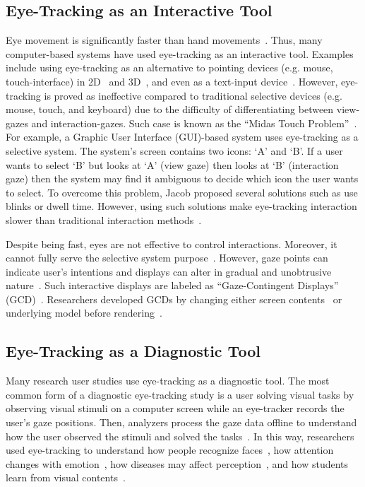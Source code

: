 \subsection{Eye-Tracking as an Interactive Tool}
\label{sec:EyeTrackingInteractive}
Eye movement is significantly faster than hand movements~\cite{sibert2000evaluation}. Thus, many computer-based systems have used eye-tracking as an interactive tool. Examples include using eye-tracking as an alternative to pointing devices (e.g. mouse, touch-interface) in 2D~\cite{Jacob91} and 3D~\cite{Bolt90, Tan00}, and even as a text-input device~\cite{Maj02}. However, eye-tracking is proved as ineffective compared to traditional selective devices (e.g. mouse, touch, and keyboard) due to the difficulty of differentiating between view-gazes and interaction-gazes. Such case is known as the ``Midas Touch Problem''~\cite{Jacob91}. For example, a Graphic User Interface (GUI)-based system uses eye-tracking as a selective system. The system's screen contains two icons: `A' and `B'. If a user wants to select `B' but looks at `A' (view gaze) then looks at `B' (interaction gaze) then the system may find it ambiguous to decide which icon the user wants to select. To overcome this problem, Jacob proposed several solutions such as use blinks or dwell time. However, using such solutions make eye-tracking interaction slower than traditional interaction methods~\cite{Jacob91}. 

Despite being fast, eyes are not effective to control interactions. Moreover, it cannot fully serve the selective system purpose~\cite{Zha99}. However, gaze points can indicate user's intentions and displays can alter in gradual and unobtrusive nature~\cite{Jacob91, Jacob03}. Such interactive displays are labeled as ``Gaze-Contingent Displays'' (GCD)~\cite{Duch07}.  Researchers developed GCDs by changing either screen contents~\cite{Rein03, PN02} or underlying model before rendering~\cite{Dan00, OD01, ODH02, Okoe14}. 

\subsection{Eye-Tracking as a Diagnostic Tool}
\label{sec:EyeTrackingDiagnostic}
Many research user studies use eye-tracking as a diagnostic tool. The most common form of a diagnostic eye-tracking study is a user solving visual tasks by observing visual stimuli on a computer screen while an eye-tracker records the user's gaze positions. Then, analyzers process the gaze data offline to understand how the user observed the stimuli and solved the tasks~\cite{Duch07}. In this way, researchers used eye-tracking to understand how people recognize faces~\cite{Guo14, Sha14}, how attention changes with emotion~\cite{Ver13}, how diseases may affect perception~\cite{Kim14}, and how students learn from visual contents~\cite{Zaw15, May10, vGo10, Con13}.

